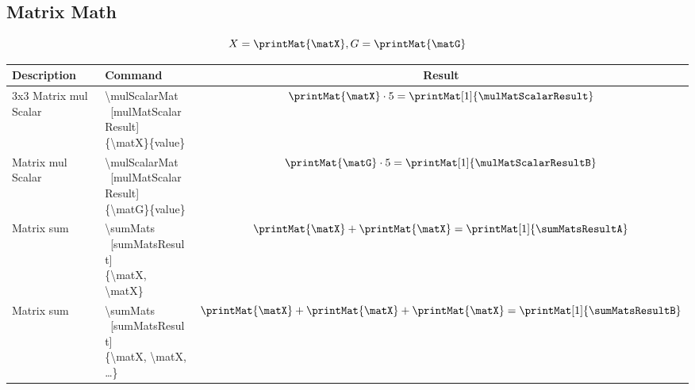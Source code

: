 \documentclass[10pt, a4paper]{article}
\begin{document}
\subsection*{Matrix Math}


\[
    X = \printMat{\matX}, G = \printMat{\matG}
\]

\sumMats[sumMatsResultA]{\matX, \matX}
\sumMats[sumMatsResultB]{\matX, \matX, \matX}

\begin{center}
    \begin{tabular}{ l l c }
        Description & Command & Result\\ \hline
        3x3 Matrix mul Scalar & \makecell[l]{\textbackslash mulScalarMat\\\ [mulMatScalarResult]\\\{\textbackslash matX\}\{value\}} & \(\printMat{\matX} \cdot 5 = \printMat[1]{\mulMatScalarResult}\)\\
        Matrix mul Scalar & \makecell[l]{\textbackslash mulScalarMat\\\ [mulMatScalarResult]\\\{\textbackslash matG\}\{value\}} & \(\printMat{\matG} \cdot 5 = \printMat[1]{\mulMatScalarResultB}\)\\
        Matrix sum & \makecell[l]{\textbackslash sumMats\\\ [sumMatsResult]\\\{\textbackslash matX, \textbackslash matX\}} & \(\printMat{\matX} + \printMat{\matX} = \printMat[1]{\sumMatsResultA}\)\\
        Matrix sum & \makecell[l]{\textbackslash sumMats\\\ [sumMatsResult]\\\{\textbackslash matX, \textbackslash matX, \dots\}} & \(\printMat{\matX} + \printMat{\matX} + \printMat{\matX} = \printMat[1]{\sumMatsResultB}\)
    \end{tabular}
\end{center}



\end{document}
